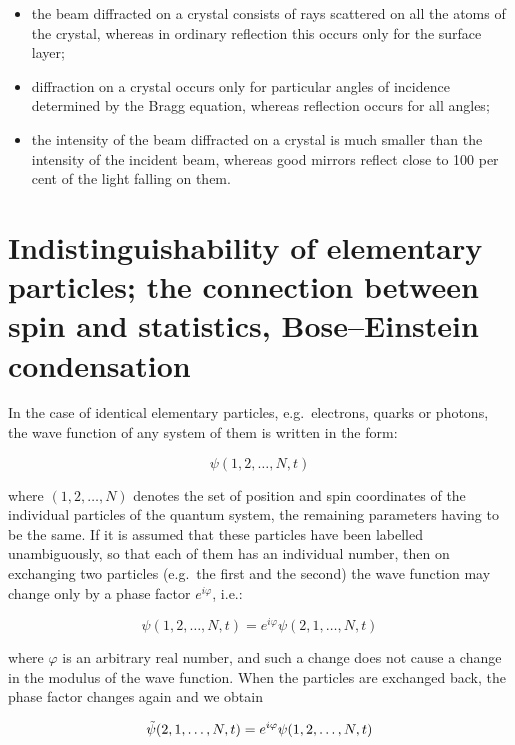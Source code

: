 \begin{itemize}
    \item the beam diffracted on a crystal consists of rays scattered on all the atoms of the crystal, whereas in ordinary reflection this occurs only for the surface layer;
    \item diffraction on a crystal occurs only for particular angles of incidence determined by the Bragg equation, whereas reflection occurs for all angles;
    \item the intensity of the beam diffracted on a crystal is much smaller than the intensity of the incident beam, whereas good mirrors reflect close to 100 per cent of the light falling on them.
\end{itemize}

\section{Indistinguishability of elementary particles; the connection between spin and statistics, Bose--Einstein condensation}

In the case of identical elementary particles, e.g.\ electrons, quarks or photons, the wave function of any system of them is written in the form:

\begin{equation}
    \psi (1,2,\dots,N,t)
\end{equation}

where $(1,2,\dots,N)$ denotes the set of position and spin coordinates of the individual particles of the quantum system, the remaining parameters having to be the same. If it is assumed that these particles have been labelled unambiguously, so that each of them has an individual number, then on exchanging two particles (e.g.\ the first and the second) the wave function may change only by a phase factor $e^{i\varphi}$, i.e.:

\begin{equation} \label{eq:identical}
    \psi (1,2,\dots,N,t) = e^{i\varphi} \psi (2,1,\dots,N,t)
\end{equation}

where $\varphi$ is an arbitrary real number, and such a change does not cause a change in the modulus of the wave function. When the particles are exchanged back, the phase factor changes again and we obtain

\begin{equation}
    \Tilde{\psi} (2,1,\dots,N,t) = e^{i\varphi} \psi (1,2,\dots,N,t)
\end{equation}

